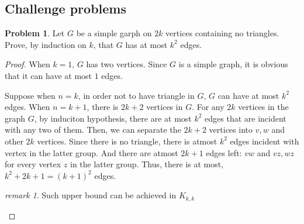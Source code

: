 \documentclass[a4paper,11pt]{article}%
\theoremstyle{remark}
\newtheorem*{remark}{remark}
\theoremstyle{definition}
\newtheorem{problem}{Problem}[subsection]
\begin{document}
\subsection{Challenge problems}
\begin{problem}
    Let $G$ be a simple garph on $2k$ vertices containing no triangles.
    Prove, by induction on $k$, that $G$ has at most $k^2$ edges.
    \begin{proof}
       When $k=1$, $G$ has two vertices. Since $G$ is a simple graph, it 
       is obvious that it can have at most $1$ edges. 

       Suppose when $n=k$, in order not to have triangle in $G$, 
       $G$ can have at most $k^2$ edges.
       When $n=k+1$, there is $2k+2$ vertices in $G$. For any $2k$ vertices 
       in the graph $G$, by induciton hypothesis, there are at most 
       $k^2$ edges that are incident with any two of them. 
       Then, we can separate the $2k+2$ vertices into $v,w$ and 
       other $2k$ vertices. Since there is no triangle, there is atmost
       $k^2$ edges incident with vertex in the latter group.
       And there are atmost $2k+1$ edges left: $vw$ and $vz,wz$ for every 
       vertex $z$ in the latter group. Thus, there is at most, $k^2+2k+1=(k+1)^2$ edges.
\begin{remark}
    Such upper bound can be achieved in $K_{k,k}$
\end{remark}
    \end{proof}
\end{problem}
\end{document}
